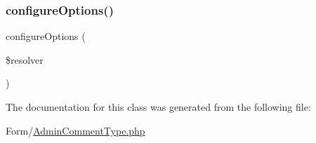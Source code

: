 \mbox{\label{class_app_1_1_form_1_1_admin_comment_type_a8ff68a86f5090b5df973286836e46ead}} 
\subsubsection{\texorpdfstring{configureOptions()}{configureOptions()}}
{\footnotesize\ttfamily configure\+Options (\begin{DoxyParamCaption}\item[{Options\+Resolver}]{\$resolver }\end{DoxyParamCaption})}



The documentation for this class was generated from the following file\+:\begin{DoxyCompactItemize}
\item 
Form/\mbox{\hyperlink{_admin_comment_type_8php}{Admin\+Comment\+Type.\+php}}\end{DoxyCompactItemize}
